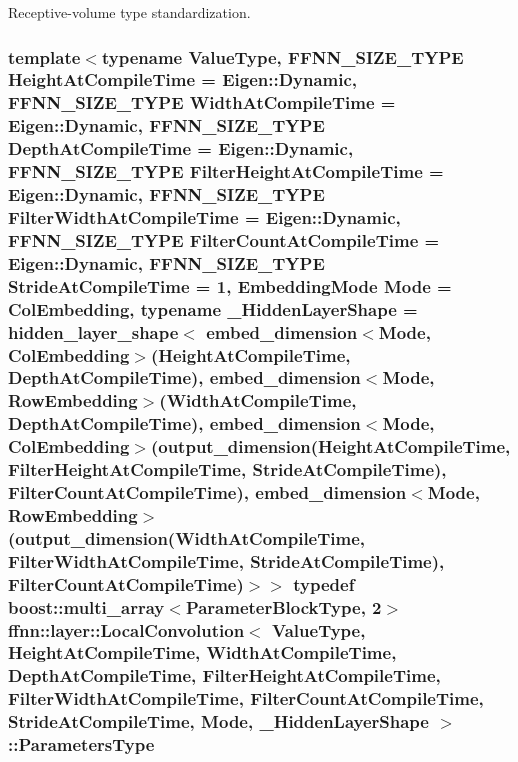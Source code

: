 Receptive-\/volume type standardization. 

\hypertarget{classffnn_1_1layer_1_1_local_convolution_a09a482b44ecab19df4547526fb9b8321}{
\subsubsection[{Parameters\-Type}]{\setlength{\rightskip}{0pt plus 5cm}template$<$typename Value\-Type, F\-F\-N\-N\-\_\-\-S\-I\-Z\-E\-\_\-\-T\-Y\-P\-E Height\-At\-Compile\-Time = Eigen\-::\-Dynamic, F\-F\-N\-N\-\_\-\-S\-I\-Z\-E\-\_\-\-T\-Y\-P\-E Width\-At\-Compile\-Time = Eigen\-::\-Dynamic, F\-F\-N\-N\-\_\-\-S\-I\-Z\-E\-\_\-\-T\-Y\-P\-E Depth\-At\-Compile\-Time = Eigen\-::\-Dynamic, F\-F\-N\-N\-\_\-\-S\-I\-Z\-E\-\_\-\-T\-Y\-P\-E Filter\-Height\-At\-Compile\-Time = Eigen\-::\-Dynamic, F\-F\-N\-N\-\_\-\-S\-I\-Z\-E\-\_\-\-T\-Y\-P\-E Filter\-Width\-At\-Compile\-Time = Eigen\-::\-Dynamic, F\-F\-N\-N\-\_\-\-S\-I\-Z\-E\-\_\-\-T\-Y\-P\-E Filter\-Count\-At\-Compile\-Time = Eigen\-::\-Dynamic, F\-F\-N\-N\-\_\-\-S\-I\-Z\-E\-\_\-\-T\-Y\-P\-E Stride\-At\-Compile\-Time = 1, Embedding\-Mode Mode = Col\-Embedding, typename \-\_\-\-Hidden\-Layer\-Shape = hidden\-\_\-layer\-\_\-shape$<$              embed\-\_\-dimension$<$\-Mode, Col\-Embedding$>$(\-Height\-At\-Compile\-Time, Depth\-At\-Compile\-Time),              embed\-\_\-dimension$<$\-Mode, Row\-Embedding$>$(\-Width\-At\-Compile\-Time,  Depth\-At\-Compile\-Time),              embed\-\_\-dimension$<$\-Mode, Col\-Embedding$>$(output\-\_\-dimension(\-Height\-At\-Compile\-Time, Filter\-Height\-At\-Compile\-Time, Stride\-At\-Compile\-Time), Filter\-Count\-At\-Compile\-Time),              embed\-\_\-dimension$<$\-Mode, Row\-Embedding$>$(output\-\_\-dimension(\-Width\-At\-Compile\-Time,  Filter\-Width\-At\-Compile\-Time,  Stride\-At\-Compile\-Time), Filter\-Count\-At\-Compile\-Time)$>$$>$ typedef boost\-::multi\-\_\-array$<${\bf Parameter\-Block\-Type}, 2$>$ {\bf ffnn\-::layer\-::\-Local\-Convolution}$<$ Value\-Type, Height\-At\-Compile\-Time, Width\-At\-Compile\-Time, Depth\-At\-Compile\-Time, Filter\-Height\-At\-Compile\-Time, Filter\-Width\-At\-Compile\-Time, Filter\-Count\-At\-Compile\-Time, Stride\-At\-Compile\-Time, Mode, \-\_\-\-Hidden\-Layer\-Shape $>$\-::{\bf Parameters\-Type}}}\label{classffnn_1_1layer_1_1_local_convolution_a09a482b44ecab19df4547526fb9b8321}


